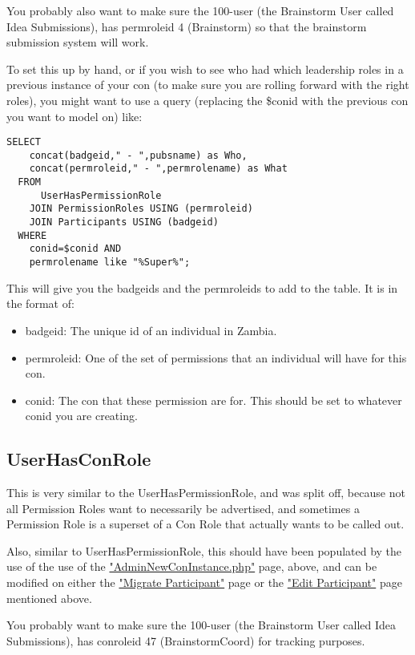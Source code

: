 \documentclass[captions=tablesignature]{scrartcl}
\begin{document}
You probably also want to make sure the 100-user (the Brainstorm
User called Idea Submissions), has permroleid 4 (Brainstorm) so
that the brainstorm submission system will work.

To set this up by hand, or if you wish to see who had which
leadership roles in a previous instance of your con (to make sure
you are rolling forward with the right roles), you might want to
use a query (replacing the \$conid with the previous con you want to
model on) like:
\begin{verbatim}
SELECT
    concat(badgeid," - ",pubsname) as Who,
    concat(permroleid," - ",permrolename) as What
  FROM
      UserHasPermissionRole
    JOIN PermissionRoles USING (permroleid)
    JOIN Participants USING (badgeid)
  WHERE
    conid=$conid AND
    permrolename like "%Super%";
\end{verbatim}
This will give you the badgeids and the permroleids to add to the
table.  It is in the format of:
\begin{itemize}
\item badgeid: The unique id of an individual in Zambia.
\item permroleid: One of the set of permissions that an individual will
have for this con.
\item conid: The con that these permission are for.  This should be set
to whatever conid you are creating.
\end{itemize}

\subsection{UserHasConRole}
\label{sec-12-2}

This is very similar to the UserHasPermissionRole, and was split
off, because not all Permission Roles want to necessarily be
advertised, and sometimes a Permission Role is a superset of a Con
Role that actually wants to be called out.

Also, similar to UserHasPermissionRole, this should have been
populated by the use of the use of the \href{../webpages/AdminNewConInstance.php}{"AdminNewConInstance.php"}
page, above, and can be modified on either the \href{../webpages/StaffEditCreateParticipant.php?action=migrate}{"Migrate Participant"}
page or the \href{../webpages/StaffEditCreateParticipant.php?action=edit}{"Edit Participant"} page mentioned above.

You probably want to make sure the 100-user (the Brainstorm User
called Idea Submissions), has conroleid 47 (BrainstormCoord) for
tracking purposes.
\end{document}
